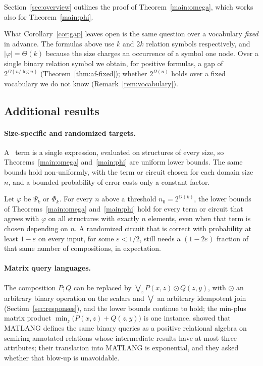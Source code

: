 Section~\ref{sec:overview} outlines the proof of
Theorem~\ref{main:omega}, which works also for Theorem~\ref{main:phi}.

What Corollary~\ref{cor:gap} leaves open is the same question over a
vocabulary \emph{fixed} in advance. The formulas above use $k$ and $2k$
relation symbols respectively,
and $|\varphi|=\Theta(k)$ because the size charges an occurrence of a symbol
one node. Over a single binary relation symbol we obtain, for positive formulas, a gap of
$2^{\Omega(n/\log n)}$ (Theorem~\ref{thm:af-fixed}); whether $2^{\Omega(n)}$
holds over a fixed vocabulary we do not know
(Remark~\ref{rem:vocabulary}).

\subsection{Additional results}\label{sec:additional-results}

\paragraph{Size-specific and randomized targets.}
A \CoR\ term is a single expression, evaluated on structures of every size,
so Theorems~\ref{main:omega} and~\ref{main:phi} are uniform lower bounds.
The same bounds hold non-uniformly, with the term or circuit chosen for each
domain size $n$, and a bounded probability of error costs only a constant
factor.

\begin{theorem}\label{main:robust}
Let $\varphi$ be $\Psi_k$ or $\Phi_k$. For every $n$ above a threshold
$n_0=2^{O(k)}$, the lower bounds of Theorems~\ref{main:omega}
and~\ref{main:phi} hold for every term or circuit that agrees with $\varphi$
on all structures with exactly $n$ elements, even when that term is chosen
depending on $n$. A randomized circuit that is correct with probability at
least $1-\varepsilon$ on every input, for some $\varepsilon<1/2$, still
needs a $(1-2\varepsilon)$ fraction of that same number of compositions, in
expectation.
\end{theorem}

\paragraph{Matrix query languages.}
The composition $P;Q$ can be replaced by $\bigvee_zP(x,z)\odot Q(z,y)$, with
$\odot$ an arbitrary binary operation on the scalars and $\bigvee$ an
arbitrary idempotent join (Section~\ref{sec:responses}), and the lower
bounds continue to hold; the min-plus matrix product
$\min_z\bigl(P(x,z)+Q(z,y)\bigr)$ is one instance. \citet{brijder2022}
showed that MATLANG defines the same binary queries as a positive
relational algebra on semiring-annotated relations whose intermediate
results have at most three attributes; their translation into MATLANG is
exponential, and they asked whether that blow-up is unavoidable.

